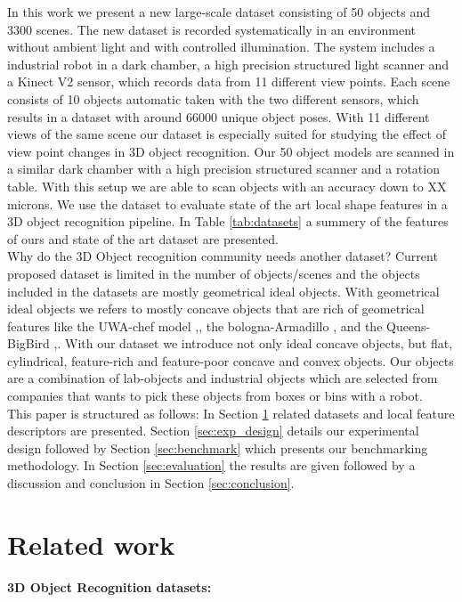 \documentclass[10pt,twocolumn,letterpaper]{article}
\begin{document}
In this work we present a new large-scale dataset consisting of 50 objects and 3300 scenes. The new dataset is recorded systematically in an environment without ambient light and with controlled illumination. The system includes a industrial robot in a dark chamber, a high precision structured light scanner and a Kinect V2 sensor, which records data from 11 different view points. Each scene consists of 10 objects automatic taken with the two different sensors, which results in a dataset with around 66000 unique object poses. With 11 different views of the same scene our dataset is especially suited for studying the effect of view point changes in 3D object recognition. Our 50 object models are scanned in a similar dark chamber with a high precision structured scanner and a rotation table. With this setup we are able to scan objects with an accuracy down to XX microns. We use the dataset to evaluate state of the art local shape features in a 3D object recognition pipeline. In Table \ref{tab:datasets} a summery of the features of ours and state of the art dataset are presented.\\
Why do the 3D Object recognition community needs another dataset? Current proposed dataset is limited in the number of objects/scenes and the objects included in the datasets are mostly geometrical ideal objects. With geometrical ideal objects we refers to mostly concave objects that are rich of geometrical features like the UWA-chef model \cite{Mian2006},\cite{Mian2010}, the bologna-Armadillo \cite{Salti2014},\cite{Tombari2010} and the Queens-BigBird \cite{Taati2007},\cite{Taati2007}. With our dataset we introduce not only ideal concave objects, but flat, cylindrical, feature-rich and feature-poor concave and convex objects. Our objects are a combination of lab-objects and industrial objects which are selected from companies that wants to pick these objects from boxes or bins with a robot.\\
This paper is structured as follows: In Section \ref{sec:related_work} related datasets and local feature descriptors are presented. Section \ref{sec:exp_design} details our experimental design followed by Section \ref{sec:benchmark} which presents our benchmarking methodology. In Section \ref{sec:evaluation} the results are given followed by a discussion and conclusion in Section \ref{sec:conclusion}. 
	\section{Related work} \label{sec:related_work}
\textbf{3D Object Recognition datasets:}\\
\end{document}
